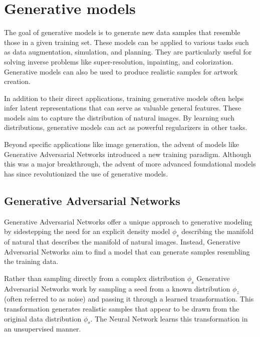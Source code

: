 \section{Generative models}

The goal of generative models is to generate new data samples that resemble those in a given training set. 
These models can be applied to various tasks such as data augmentation, simulation, and planning.
They are particularly useful for solving inverse problems like super-resolution, inpainting, and colorization. 
Generative models can also be used to produce realistic samples for artwork creation.

In addition to their direct applications, training generative models often helps infer latent representations that can serve as valuable general features. 
These models aim to capture the distribution of natural images. 
By learning such distributions, generative models can act as powerful regularizers in other tasks.

Beyond specific applications like image generation, the advent of models like Generative Adversarial Networks introduced a new training paradigm. 
Although this was a major breakthrough, the advent of more advanced foundational models has since revolutionized the use of generative models.

\subsection{Generative Adversarial Networks}
Generative Adversarial Networks offer a unique approach to generative modeling by sidestepping the need for an explicit density model $\phi_s$ describing the manifold of natural that describes the manifold of natural images. 
Instead, Generative Adversarial Networks aim to find a model that can generate samples resembling the training data. 

Rather than sampling directly from a complex distribution $\phi_s$ Generative Adversarial Networks work by sampling a seed from a known distribution $\phi_z$ (often referred to as noise) and passing it through a learned transformation. 
This transformation generates realistic samples that appear to be drawn from the original data distribution $\phi_s$. 
The Neural Network learns this transformation in an unsupervised manner.

